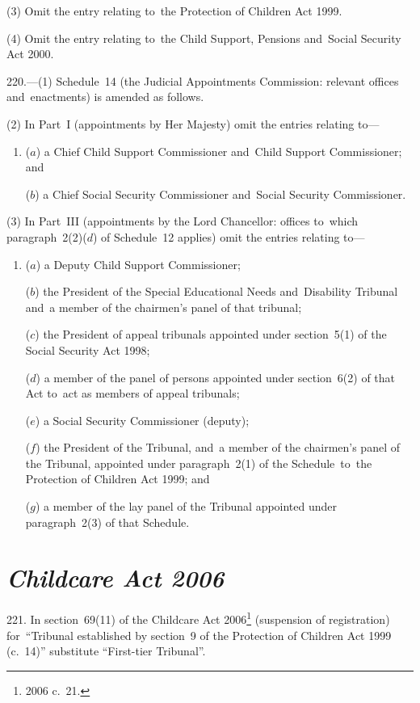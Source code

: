 \documentclass[12pt,a4paper]{article}
\begin{document}
(3) Omit the entry relating to~the Protection of Children Act 1999.

(4) Omit the entry relating to~the Child Support, Pensions and~Social Security Act 2000.

\medskip

220.---(1)  Schedule~14 (the Judicial Appointments Commission: relevant offices and~enactments) is amended as follows.

(2) In Part~I (appointments by Her Majesty) omit the entries relating to—
\begin{enumerate}\item[]
($a$) a Chief Child Support Commissioner and~Child Support Commissioner; and

($b$) a Chief Social Security Commissioner and~Social Security Commissioner.
\end{enumerate}

(3) In Part~III (appointments by the Lord Chancellor: offices to~which paragraph~2(2)($d$)  of Schedule~12 applies) omit the entries relating to—
\begin{enumerate}\item[]
($a$) a Deputy Child Support Commissioner;

($b$) the President of the Special Educational Needs and~Disability Tribunal and~a member of the chairmen’s panel of that tribunal;

($c$) the President of appeal tribunals appointed under section~5(1) of the Social Security Act 1998;

($d$) a member of the panel of persons appointed under section~6(2) of that Act to~act as members of appeal tribunals;

($e$) a Social Security Commissioner (deputy);

($f$) the President of the Tribunal, and~a member of the chairmen’s panel of the Tribunal, appointed under paragraph~2(1) of the Schedule~to~the Protection of Children Act 1999; and

($g$) a member of the lay panel of the Tribunal appointed under paragraph~2(3) of that Schedule.
\end{enumerate}

\section*{\itshape Childcare Act 2006}

221.  In section~69(11) of the Childcare Act 2006\footnote{2006 c.~21.} (suspension of registration) for~“Tribunal established by section~9 of the Protection of Children Act 1999 (c.~14)” substitute “First-tier Tribunal”.
\end{document}
